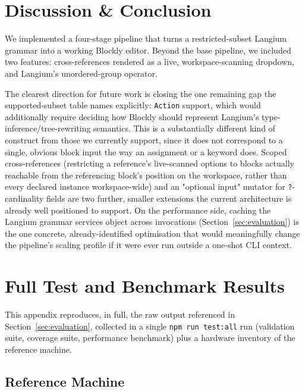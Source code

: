 \documentclass[runningheads]{llncs}
\begin{document}
{\section{Discussion \& Conclusion}
We implemented a four-stage pipeline that turns a restricted-subset Langium grammar into a working Blockly editor. Beyond the base pipeline, we included two features: cross-references rendered as a live, workspace-scanning dropdown, and Langium's unordered-group operator.

The clearest direction for future work is closing the one remaining gap the supported-subset table names explicitly: \texttt{Action} support, which would additionally require deciding how Blockly should represent Langium's type-inference/tree-rewriting semantics. This is a substantially different kind of construct from those we currently support, since it does not correspond to a single, obvious block input the way an assignment or a keyword does. Scoped cross-references (restricting a reference's live-scanned options to blocks actually reachable from the referencing block's position on the workspace, rather than every declared instance workspace-wide) and an "optional input" mutator for \texttt{?}-cardinality fields are two further, smaller extensions the current architecture is already well positioned to support. On the performance side, caching the Langium grammar services object across invocations (Section~\ref{sec:evaluation}) is the one concrete, already-identified optimisation that would meaningfully change the pipeline's scaling profile if it were ever run outside a one-shot CLI context.

% 
% 

\newpage
\appendix
\section{Full Test and Benchmark Results}
\label{sec:appendix}

This appendix reproduces, in full, the raw output referenced in Section~\ref{sec:evaluation}, collected in a single \texttt{npm run test:all} run (validation suite, coverage suite, performance benchmark) plus a hardware inventory of the reference machine.

\subsection{Reference Machine}
\label{sec:appendix-hw}

}
\end{document}
